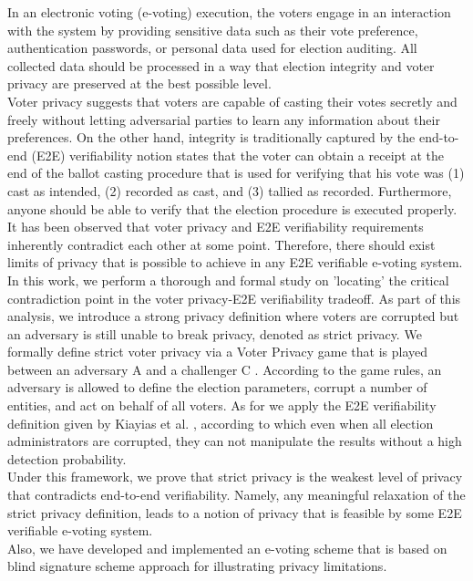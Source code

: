 % 
% 
%
In an electronic voting (e-voting) execution, the voters engage in an interaction with the system by providing sensitive data such as their vote preference, authentication passwords, or personal data used for election auditing. All collected data should be processed in a way that election integrity and voter privacy are preserved at the best possible level. \\
Voter privacy suggests that voters are capable of casting their votes secretly and freely without letting adversarial parties to learn any information about their preferences. On the other hand, integrity is traditionally captured by  the end-to-end (E2E) verifiability notion states that the voter can obtain a receipt at the end of the ballot casting procedure that is used for verifying that his vote was (1) cast as intended, (2) recorded as cast, and (3) tallied as recorded. Furthermore, anyone should be able to verify that the election procedure is executed properly. It has been observed that voter privacy and E2E verifiability requirements inherently contradict each other at some point. Therefore, there should exist limits of privacy that is possible to achieve in any E2E verifiable e-voting system.\\
In this work, we perform a thorough and formal study on 'locating' the critical contradiction point in the voter privacy-E2E verifiability tradeoff. As part of this analysis, we introduce a strong privacy definition where voters are corrupted but an adversary is still unable to break privacy, denoted as  strict privacy. We formally define strict voter privacy via a Voter Privacy game that is played between an adversary  A and a challenger  C . According to the game rules, an adversary is allowed to define the election parameters, corrupt a number of entities, and act on behalf of all voters. As for we apply the E2E verifiability definition given by Kiayias et al. \cite{Kiayias2015}, according to which even when all election administrators are corrupted, they can not manipulate the results without a high detection probability.\\
Under this framework, we prove that strict privacy is the weakest level of privacy that contradicts end-to-end verifiability. Namely, any meaningful relaxation of the strict privacy definition, leads to a notion of privacy that is feasible by some E2E verifiable e-voting system.\\
Also, we have developed and implemented an e-voting scheme that is based on blind signature scheme approach for illustrating privacy limitations.
